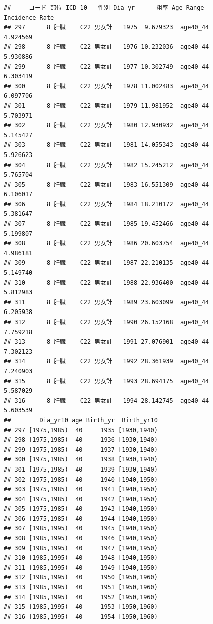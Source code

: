 \documentclass[11pt,]{article}
\begin{document}
\begin{verbatim}
##     コード 部位 ICD_10   性別 Dia_yr      粗率 Age_Range Incidence_Rate
## 297      8 肝臓    C22 男女計   1975  9.679323  age40_44       4.924569
## 298      8 肝臓    C22 男女計   1976 10.232036  age40_44       5.930886
## 299      8 肝臓    C22 男女計   1977 10.302749  age40_44       6.303419
## 300      8 肝臓    C22 男女計   1978 11.002483  age40_44       6.097706
## 301      8 肝臓    C22 男女計   1979 11.981952  age40_44       5.703971
## 302      8 肝臓    C22 男女計   1980 12.930932  age40_44       5.145427
## 303      8 肝臓    C22 男女計   1981 14.055343  age40_44       5.926623
## 304      8 肝臓    C22 男女計   1982 15.245212  age40_44       5.765704
## 305      8 肝臓    C22 男女計   1983 16.551309  age40_44       6.106017
## 306      8 肝臓    C22 男女計   1984 18.210172  age40_44       5.381647
## 307      8 肝臓    C22 男女計   1985 19.452466  age40_44       5.199807
## 308      8 肝臓    C22 男女計   1986 20.603754  age40_44       4.986181
## 309      8 肝臓    C22 男女計   1987 22.210135  age40_44       5.149740
## 310      8 肝臓    C22 男女計   1988 22.936400  age40_44       5.812983
## 311      8 肝臓    C22 男女計   1989 23.603099  age40_44       6.205938
## 312      8 肝臓    C22 男女計   1990 26.152168  age40_44       7.759218
## 313      8 肝臓    C22 男女計   1991 27.076901  age40_44       7.302123
## 314      8 肝臓    C22 男女計   1992 28.361939  age40_44       7.240903
## 315      8 肝臓    C22 男女計   1993 28.694175  age40_44       5.587029
## 316      8 肝臓    C22 男女計   1994 28.142745  age40_44       5.603539
##        Dia_yr10 age Birth_yr  Birth_yr10
## 297 [1975,1985)  40     1935 [1930,1940)
## 298 [1975,1985)  40     1936 [1930,1940)
## 299 [1975,1985)  40     1937 [1930,1940)
## 300 [1975,1985)  40     1938 [1930,1940)
## 301 [1975,1985)  40     1939 [1930,1940)
## 302 [1975,1985)  40     1940 [1940,1950)
## 303 [1975,1985)  40     1941 [1940,1950)
## 304 [1975,1985)  40     1942 [1940,1950)
## 305 [1975,1985)  40     1943 [1940,1950)
## 306 [1975,1985)  40     1944 [1940,1950)
## 307 [1985,1995)  40     1945 [1940,1950)
## 308 [1985,1995)  40     1946 [1940,1950)
## 309 [1985,1995)  40     1947 [1940,1950)
## 310 [1985,1995)  40     1948 [1940,1950)
## 311 [1985,1995)  40     1949 [1940,1950)
## 312 [1985,1995)  40     1950 [1950,1960)
## 313 [1985,1995)  40     1951 [1950,1960)
## 314 [1985,1995)  40     1952 [1950,1960)
## 315 [1985,1995)  40     1953 [1950,1960)
## 316 [1985,1995)  40     1954 [1950,1960)
\end{verbatim}
\end{document}
